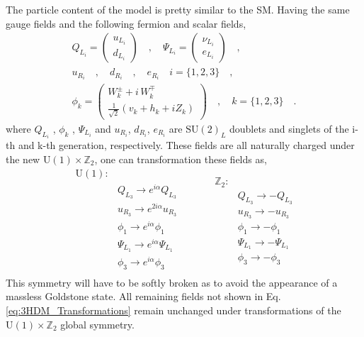 The particle content of the model is pretty similar to the SM. Having the same gauge fields and the following fermion and scalar fields,
%
\begin{equation}
\begin{gathered}
Q_{L_i} =  \begin{pmatrix}
u_{L_i}  \\
d_{L_i}
\end{pmatrix} \quad , \quad \Psi_{L_i} =  \begin{pmatrix}
\nu_{L_i}  \\
e_{L_i}
\end{pmatrix} \quad , \quad \\ 
u_{R_i} \quad , \quad d_{R_i} \quad , \quad e_{R_i} \quad i=\{1,2,3\} \quad ,  \\  
\phi_k = \begin{pmatrix}
W_k^\pm + i \, W_k^\mp \\ 
\frac{1}{\sqrt{2}}\left( v_k + h_k + i Z_k \right) 
\end{pmatrix}  \quad , \quad k=\{ 1,2,3\} \quad . 
\end{gathered} 
\end{equation}
where $Q_{L_i}$ , $\phi_k$ , $\Psi_{L_i}$ and $u_{R_i}$, $d_{R_i}$, $e_{R_i}$ are $\mathrm{SU}(2)_L$ doublets and singlets of the i-th and k-th
generation, respectively. These fields are all naturally charged under the new $\mathrm{U(1)}\times\mathbb{Z}_2$, one can transformation these fields as, 
\begin{equation}
\label{eq:3HDM_Transformations}
	\begin{split} 
	\mathrm{U(1)} : & \\
		& Q_{L_3} \rightarrow    e^{i \alpha} Q_{L_3}  \\  
		& u_{R_3} \rightarrow    e^{2 i \alpha} u_{R_3}  \\
		& \phi_1  \rightarrow    e^{i \alpha} \phi_1  \\   
		& \Psi_{L_1} \rightarrow e^{i \alpha} \Psi_{L_1} \\
		& \phi_3 \rightarrow     e^{i \alpha} \phi_3  \\ 
	\end{split} \quad \quad \quad  
	\begin{split}
		\mathbb{Z}_2 : & \\
		 	& Q_{L_3} \rightarrow -Q_{L_3} \\
		 	& u_{R_3} \rightarrow -u_{R_3} \\ 
		 	& \phi_1  \rightarrow -\phi_1 \\ 
		 	& \Psi_{L_1} \rightarrow - \Psi_{L_1} \\ 
		 	& \phi_3 \rightarrow -\phi_3
	\end{split} 
\end{equation} 
%
This symmetry will have to be softly broken as to avoid the appearance of a massless Goldstone state. All remaining fields not shown in Eq. \ref{eq:3HDM_Transformations} remain unchanged under transformations of the $\mathrm{U(1)}\times\mathbb{Z}_2$ global symmetry. 
